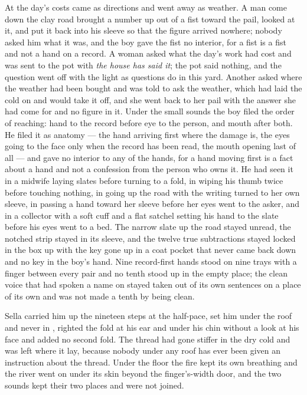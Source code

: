 At  the day's costs came as directions and went away as weather. A man come down the clay road brought a number up out of a fist toward the pail, looked at it, and put it back into his sleeve so that the figure arrived nowhere; nobody asked him what it was, and the boy gave the fist no interior, for a fist is a fist and not a hand on a record. A woman asked what the day's work had cost and was sent to the pot with \emph{the house has said it}; the pot said nothing, and the question went off with the light as questions do in this yard. Another asked where the weather had been bought and was told to ask the weather, which had laid the cold on and would take it off, and she went back to her pail with the answer she had come for and no figure in it. Under the small sounds the boy filed the order of reaching: hand to the record before eye to the person, and mouth after both. He filed it as anatomy --- the hand arriving first where the damage is, the eyes going to the face only when the record has been read, the mouth opening last of all --- and gave no interior to any of the hands, for a hand moving first is a fact about a hand and not a confession from the person who owns it. He had seen it in a midwife laying slates before turning to a fold, in  wiping his thumb twice before touching nothing, in  going up the road with the writing turned to her own sleeve, in  passing a hand toward her sleeve before her eyes went to the asker, and in a collector with a soft cuff and a flat satchel setting his hand to the slate before his eyes went to a bed. The narrow slate up the road stayed unread, the notched strip stayed in its sleeve, and the twelve true subtractions stayed locked in the box up  with the key gone up in a coat pocket that never came back down and no key in the boy's hand. Nine record-first hands stood on nine trays with a finger between every pair and no tenth stood up in the empty place; the clean voice that had spoken a name on  stayed taken out of its own sentences on a place of its own and was not made a tenth by being clean.

\scenebreak

Sella carried him up the nineteen steps at the half-pace, set him under the roof and never in , righted the fold at his ear and under his chin without a look at his face and added no second fold. The thread had gone stiffer in the dry cold and was left where it lay, because nobody under any roof has ever been given an instruction about the thread. Under the floor the fire kept its own breathing and the river went on under its skin beyond the finger's-width door, and the two sounds kept their two places and were not joined.

